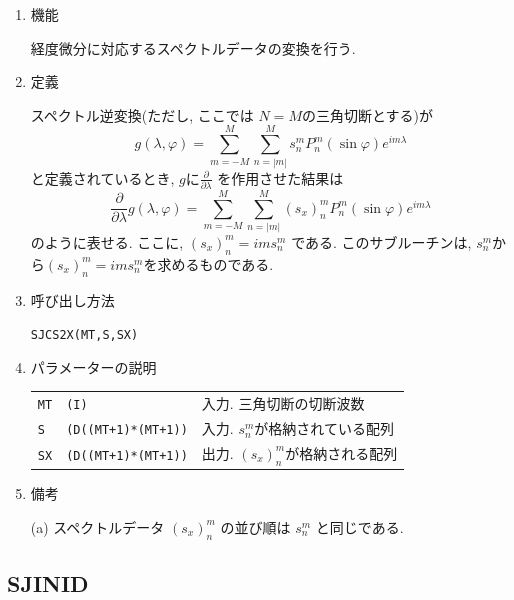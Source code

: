 \documentclass[a4j]{jarticle}
\begin{document}
\begin{enumerate}

\item 機能 

経度微分に対応するスペクトルデータの変換を行う.

\item 定義

スペクトル逆変換(ただし, ここでは $N=M$の三角切断とする)が
\begin{equation}
g(\lambda,\varphi)=\sum^M_{m=-M}\sum^M_{n=|m|}
s^m_nP^m_n(\sin\varphi)e^{im\lambda}
\end{equation}
と定義されているとき, $g$に$\frac{\partial}{\partial\lambda}$
を作用させた結果は
\begin{equation}
\frac{\partial}{\partial\lambda}
g(\lambda,\varphi)=\sum^M_{m=-M}\sum^{M}_{n=|m|}
(s_x)^m_nP^m_n(\sin\varphi)e^{im\lambda}
\end{equation}
のように表せる. ここに, $(s_x)^m_n=ims^m_n$ である.
このサブルーチンは, $s^m_n$から$(s_x)^m_n=ims^m_n$を求めるものである.

\item 呼び出し方法 

{\tt SJCS2X(MT,S,SX)}
  
\item パラメーターの説明

\begin{tabular}{lll}
{\tt MT} & {\tt (I)} & 入力. 三角切断の切断波数\\
{\tt S} & {\tt (D((MT+1)*(MT+1))} & 入力. $s^m_n$が格納されている配列\\
{\tt SX} & {\tt (D((MT+1)*(MT+1))} & 出力. $(s_x)^m_n$が格納される配列
\end{tabular}

\item 備考

(a) スペクトルデータ $(s_x)^m_n$ の並び順は $s^m_n$ と同じである.
    
\end{enumerate}


\subsection{SJINID}
\end{document}

